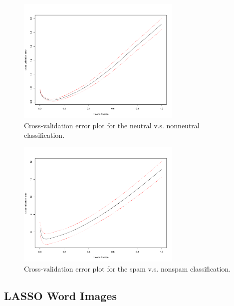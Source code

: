 \documentclass[11pt]{article}
\newcommand{\1}[1]{{\mathbf 1}\left\{#1\right\}}        %
\begin{document}
\begin{center}
\begin{figure}[!h]
   \centering
   \includegraphics[width=0.7\textwidth]{../lassoResults/CVNeuErr.pdf} 
      \caption{Cross-validation error plot for the neutral v.s. nonneutral classification. }
   \label{fig:cvplotneu}
\end{figure}
\end{center}

\begin{center}
\begin{figure}[!h]
   \centering
   \includegraphics[width=0.7\textwidth]{../lassoResults/CVSpamErr.pdf} 
      \caption{Cross-validation error plot for the spam v.s. nonspam classification. }
   \label{fig:cvplotspam}
\end{figure}
\end{center}

\clearpage
\newpage
\subsection{LASSO Word Images}\label{asec:lassowordimages}
\end{document}
